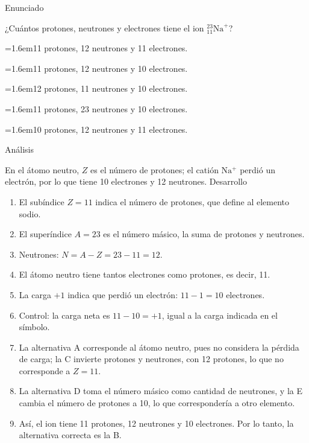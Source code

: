 \documentclass[10pt,a4paper,twocolumn]{article}
\newcommand{\alternativa}[2]{\par\noindent\hangindent=1.6em\hangafter=1\makebox[1.6em][l]{\tecla{#1}}#2\par}
\newcommand{\clave}[1]{\par\smallskip{\sffamily\footnotesize\color{esmeralda} Clave \teclaok{#1}}\par}
\begin{document}
\begin{ejemplo}
{\sffamily\footnotesize\color{zinc500} Enunciado}\par
¿Cuántos protones, neutrones y electrones tiene el ion ${}^{23}_{11}\mathrm{Na}^{+}$?
\alternativa{A}{11 protones, 12 neutrones y 11 electrones.}
\alternativa{B}{11 protones, 12 neutrones y 10 electrones.}
\alternativa{C}{12 protones, 11 neutrones y 10 electrones.}
\alternativa{D}{11 protones, 23 neutrones y 10 electrones.}
\alternativa{E}{10 protones, 12 neutrones y 11 electrones.}
\clave{B}
{\sffamily\footnotesize\color{zinc500} Análisis}\par En el átomo neutro, $Z$ es el número de protones; el catión $\mathrm{Na^+}$ perdió un electrón, por lo que tiene 10 electrones y 12 neutrones.
{\sffamily\footnotesize\color{zinc500} Desarrollo}
\begin{enumerate}
  \item El subíndice $Z = 11$ indica el número de protones, que define al elemento sodio.
  \item El superíndice $A = 23$ es el número másico, la suma de protones y neutrones.
  \item Neutrones: $N = A - Z = 23 - 11 = 12$.
  \item El átomo neutro tiene tantos electrones como protones, es decir, 11.
  \item La carga $+1$ indica que perdió un electrón: $11 - 1 = 10$ electrones.
  \item Control: la carga neta es $11 - 10 = +1$, igual a la carga indicada en el símbolo.
  \item La alternativa A corresponde al átomo neutro, pues no considera la pérdida de carga; la C invierte protones y neutrones, con 12 protones, lo que no corresponde a $Z = 11$.
  \item La alternativa D toma el número másico como cantidad de neutrones, y la E cambia el número de protones a 10, lo que correspondería a otro elemento.
  \item Así, el ion tiene 11 protones, 12 neutrones y 10 electrones. Por lo tanto, la alternativa correcta es la B.
\end{enumerate}
\end{ejemplo}
\end{document}
